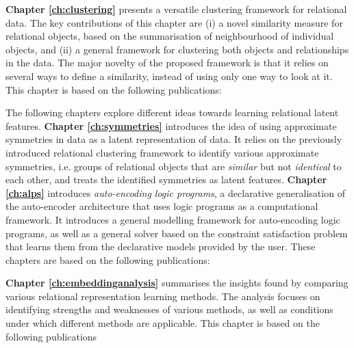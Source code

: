 \textbf{Chapter \ref{ch:clustering}} presents a versatile clustering framework for relational data.
The key contributions of this chapter are (i) a novel similarity measure for relational objects, based on the summarisation of neighbourhood of individual objects, and (ii) a general framework for clustering both objects and relationships in the data.
The major novelty of the proposed framework is that it relies on several ways to define a similarity, instead of using only one way to look at it.
This chapter is based on the following publications:

\begin{quote}
\end{quote}

\begin{quote}
\end{quote}



The following chapters explore different ideas towards learning relational latent features.
\textbf{Chapter \ref{ch:symmetries}} introduces the idea of using approximate symmetries in data as a latent representation of data.
It relies on the previously introduced relational clustering framework to identify various approximate symmetries, i.e. groups of relational objects that are \textit{similar} but not \textit{identical} to each other, and treats the identified symmetries as latent features.
\textbf{Chapter \ref{ch:alps}} introduces \textit{auto-encoding logic programs}, a declarative generalisation of the auto-encoder architecture \cite{Hinton504} that uses logic programs as a computational framework.
It introduces a general modelling framework for auto-encoding logic programs, as well as a general solver based on the constraint satisfaction problem that learns them from the declarative models provided by the user.
These chapters are based on the following publications:

\begin{quote}
\end{quote}

\begin{quote}
\end{quote}

\begin{quote}
\end{quote}


\textbf{Chapter \ref{ch:embeddinganalysis}} summarises the insights found by comparing various relational representation learning methods.
The analysis focuses on identifying strengths and weaknesses of various methods, as well as conditions under which different methods are applicable.
This chapter is based on the following publications

